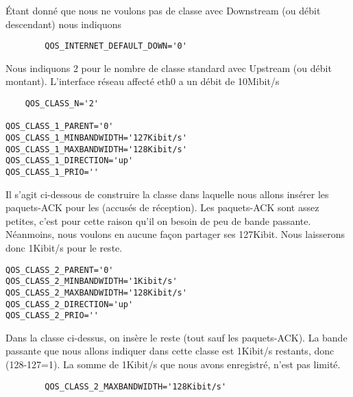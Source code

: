     Étant donné que nous ne voulons pas de classe avec Downstream (ou débit
    descendant) nous indiquons

\begin{example}
\begin{verbatim}
        QOS_INTERNET_DEFAULT_DOWN='0'
\end{verbatim}
\end{example}

    Nous indiquons 2 pour le nombre de classe standard avec Upstream (ou
    débit montant). L'interface réseau affecté eth0 a un débit de 10Mibit/s

\begin{small}
\begin{example}
\begin{verbatim}
    QOS_CLASS_N='2'

QOS_CLASS_1_PARENT='0'
QOS_CLASS_1_MINBANDWIDTH='127Kibit/s'
QOS_CLASS_1_MAXBANDWIDTH='128Kibit/s'
QOS_CLASS_1_DIRECTION='up'
QOS_CLASS_1_PRIO=''

\end{verbatim}
\end{example}
\end{small}

    Il s'agit ci-dessous de construire la classe dans laquelle nous
    allons insérer les paquets-ACK pour les (accusés de réception). Les
    paquets-ACK sont assez petites, c'est pour cette raison qu'il on besoin
    de peu de bande passante. Néanmoins, nous voulons en aucune façon partager
    ses 127Kibit. Nous laisserons donc 1Kibit/s pour le reste.

\begin{small}
\begin{example}
\begin{verbatim}
QOS_CLASS_2_PARENT='0'
QOS_CLASS_2_MINBANDWIDTH='1Kibit/s'
QOS_CLASS_2_MAXBANDWIDTH='128Kibit/s'
QOS_CLASS_2_DIRECTION='up'
QOS_CLASS_2_PRIO=''
\end{verbatim}
\end{example}
\end{small}

    Dans la classe ci-dessus, on insère le reste (tout sauf les paquets-ACK).
    La bande passante que nous allons indiquer dans cette classe est
    1Kibit/s restants, donc (128-127=1). La somme de 1Kibit/s que nous avons
    enregistré, n'est pas limité.

\begin{example}
\begin{verbatim}
        QOS_CLASS_2_MAXBANDWIDTH='128Kibit/s'
\end{verbatim}
\end{example}

